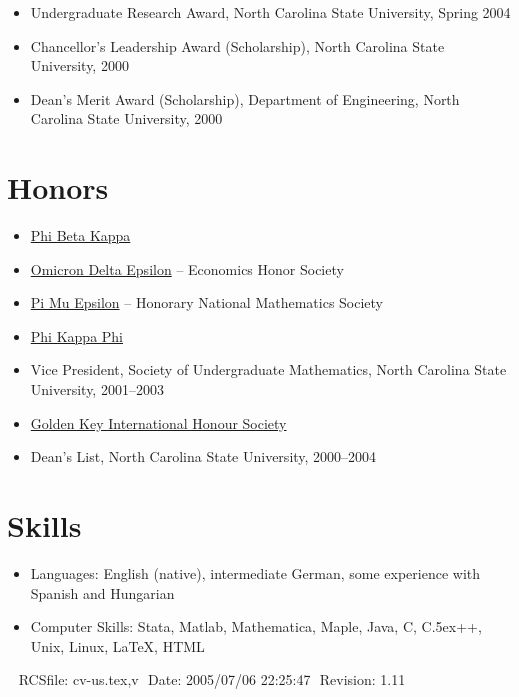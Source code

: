 \documentclass[overlapped,line,draft,11pt,letterpaper]{res}
\def\Cplusplus{{\rm C\raise.5ex\hbox{\small ++}}}
\begin{document}
\begin{resume}
\begin{itemize}
\item Undergraduate Research Award, North Carolina State University,
  Spring 2004
\item Chancellor's Leadership Award (Scholarship), North Carolina State
  University, 2000
\item Dean's Merit Award (Scholarship), Department of Engineering, North
  Carolina State University, 2000
\end{itemize}


\section{\bf Honors}
\begin{itemize}
\item \href{http://www.pbk.org/}{Phi Beta Kappa}
\item \href{http://www.cba.ua.edu/~ode/}
  {Omicron Delta Epsilon} -- Economics Honor Society
\item \href{http://www.pme-math.org/}
  {Pi Mu Epsilon} -- Honorary National Mathematics Society
\item \href{http://www.phikappaphi.org/}{Phi Kappa Phi}
\item Vice President, Society of Undergraduate Mathematics, North
  Carolina State University, 2001--2003
\item \href{http://www.goldenkey.org}{Golden Key International Honour Society}
\item Dean's List, North Carolina State University, 2000--2004
\end{itemize}


\section{\bf Skills}
\begin{itemize}
\item Languages: English (native), intermediate German,
  some experience with Spanish and Hungarian
\item Computer Skills: Stata, Matlab, Mathematica, Maple, Java, C,
  \Cplusplus, Unix, Linux, \LaTeX, HTML
\end{itemize}


\begin{center}
\vspace{\fill}\ \newline
{\tiny \rm $ $RCSfile: cv-us.tex,v $ $ }
{\tiny \rm $ $Date: 2005/07/06 22:25:47 $ $ }
{\tiny \rm $ $Revision: 1.11 $ $ }
\end{center}

\end{resume}
\end{document}
